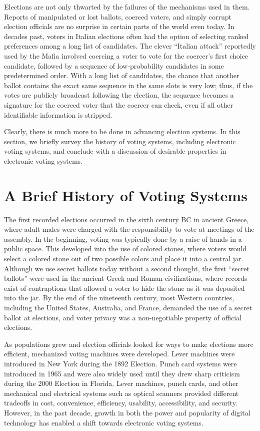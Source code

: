 Elections are not only thwarted by the failures of the mechanisms used in them. Reports of manipulated or lost ballots, coerced voters, and simply corrupt election officials are no surprise in certain parts of the world even today. In decades past, voters in Italian elections often had the option of selecting ranked preferences among a long list of candidates. The clever ``Italian attack'' reportedly used by the Mafia involved coercing a voter to vote for the coercer's first choice candidate, followed by a sequence of low-probability candidates in some predetermined order. With a long list of candidates, the chance that another ballot contains the exact same sequence in the same slots is very low; thus, if the votes are publicly broadcast following the election, the sequence becomes a signature for the coerced voter that the coercer can check, even if all other identifiable information is stripped.

Clearly, there is much more to be done in advancing election systems. In this section, we briefly survey the history of voting systems, including electronic voting systems, and conclude with a discussion of desirable properties in electronic voting systems.

\section{A Brief History of Voting Systems}

The first recorded elections occurred in the sixth century BC in ancient Greece, where adult males were charged with the responsibility to vote at meetings of the assembly. In the beginning, voting was typically done by a raise of hands in a public space. This developed into the use of colored stones, where voters would select a colored stone out of two possible colors and place it into a central jar. Although we use secret ballots today without a second thought, the first ``secret ballots'' were used in the ancient Greek and Roman civilizations, where records exist of contraptions that allowed a voter to hide the stone as it was deposited into the jar. By the end of the nineteenth century, most Western countries, including the United States, Australia, and France, demanded the use of a secret ballot at elections, and voter privacy was a non-negotiable property of official elections.

As populations grew and election officials looked for ways to make elections more efficient, mechanized voting machines were developed. Lever machines were introduced in New York during the 1892 Election. Punch card systems were introduced in 1965 and were also widely used until they drew sharp criticism during the 2000 Election in Florida. Lever machines, punch cards, and other mechanical and electrical systems such as optical scanners provided different tradeoffs in cost, convenience, efficiency, usability, accessibility, and security. However, in the past decade, growth in both the power and popularity of digital technology has enabled a shift towards electronic voting systems.

